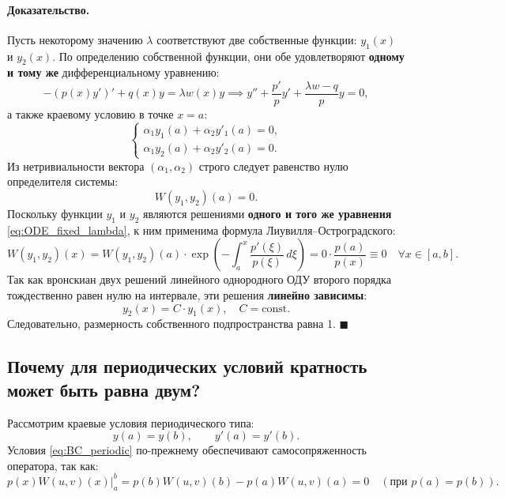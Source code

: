 \documentclass[12pt,a4paper]{article}
\begin{document}
\paragraph{Доказательство.}
Пусть некоторому значению $\lambda$ соответствуют две собственные функции: $y_1(x)$ и $y_2(x)$. 
По определению собственной функции, они обе удовлетворяют \textbf{одному и тому же} дифференциальному уравнению:
\begin{equation}
    -(p(x)y')' + q(x)y = \lambda w(x)y \implies y'' + \frac{p'}{p}y' + \frac{\lambda w - q}{p}y = 0,
    \label{eq:ODE_fixed_lambda}
\end{equation}
а также краевому условию в точке $x = a$:
\begin{equation}
    \begin{cases}
        \alpha_1 y_1(a) + \alpha_2 y'_1(a) = 0, \\
        \alpha_1 y_2(a) + \alpha_2 y'_2(a) = 0.
    \end{cases}
\end{equation}
Из нетривиальности вектора $(\alpha_1, \alpha_2)$ строго следует равенство нулю определителя системы:
\begin{equation}
    W(y_1, y_2)(a) = 0.
\end{equation}
Поскольку функции $y_1$ и $y_2$ являются решениями \textbf{одного и того же уравнения} \eqref{eq:ODE_fixed_lambda}, к ним применима формула Лиувилля--Остроградского:
\begin{equation}
    W(y_1, y_2)(x) = W(y_1, y_2)(a) \cdot \exp\left( -\int_a^x \frac{p'(\xi)}{p(\xi)}\,d\xi \right) = 0 \cdot \frac{p(a)}{p(x)} \equiv 0 \quad \forall x \in [a, b].
\end{equation}
Так как вронскиан двух решений линейного однородного ОДУ второго порядка тождественно равен нулю на интервале, эти решения \textbf{линейно зависимы}:
\begin{equation}
    y_2(x) = C \cdot y_1(x), \quad C = \text{const}.
\end{equation}
Следовательно, размерность собственного подпространства равна 1. $\blacksquare$

\subsection{Почему для периодических условий кратность может быть равна двум?}

Рассмотрим краевые условия периодического типа:
\begin{equation}
    y(a) = y(b), \qquad y'(a) = y'(b).
    \label{eq:BC_periodic}
\end{equation}
Условия \eqref{eq:BC_periodic} по-прежнему обеспечивают самосопряженность оператора, так как:
\begin{equation*}
    \left. p(x) W(u, v)(x) \right|_a^b = p(b)W(u, v)(b) - p(a)W(u, v)(a) = 0 \quad (\text{при } p(a)=p(b)).
\end{equation*}
\end{document}

